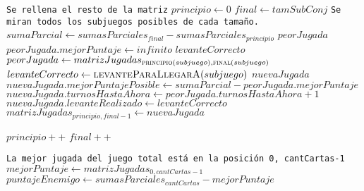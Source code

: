 \documentclass[11pt, a4paper, twoside]{article}
\begin{document}
\begin{algorithm}[H]
\ContinuedFloat
\footnotesize\begin{algorithmic}
	\Statex \texttt{Se rellena el resto de la matriz}
							
		\State $principio \gets 0$											
		\State $final \gets tamSubConj$										
		\Statex \hspace{0.37cm} \texttt{Se miran todos los subjuegos posibles de cada tamaño.} 
												
			\State $sumaParcial \gets sumasParciales_{final} - sumasParciales_{principio}$ 
			\State $peorJugada$												
			\State $peorJugada.mejorPuntaje \gets infinito$					
			\State $levanteCorrecto$										
				 
					\State $peorJugada \gets matrizJugadas_{\Call{principio}{subjuego}, \Call{final}{subjuego}}$ 
					\State $levanteCorrecto \gets \Call{levanteParaLlegarA}{subjuego}$ 
				\EndIf
			\EndFor
			\State $nuevaJugada$											
			\State $nuevaJugada.mejorPuntajePosible \gets sumaParcial - peorJugada.mejorPuntaje$   
			\State $nuevaJugada.turnosHastaAhora \gets peorJugada.turnosHastaAhora +1$   
			\State $nuevaJugada.levanteRealizado \gets levanteCorrecto$		
			\State $matrizJugadas_{principio,final-1} \gets nuevaJugada$	
			
			\State $principio++$											
			\State $final++$												
		\EndWhile
	\EndFor

	\bigskip

	\Statex \texttt{La mejor jugada del juego total está en la posición 0, cantCartas-1}
	\State $mejorPuntaje \gets matrizJugadas_{0, cantCartas -1}$			
	\State $puntajeEnemigo \gets sumasParciales_{cantCartas} - mejorPuntaje$   
	
	\bigskip


\end{algorithmic}
\end{algorithm}
\end{document}
